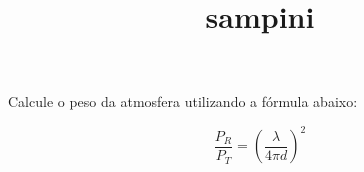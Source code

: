 \documentclass[prova]{braun}
\title{sampini}
\begin{document}
\maketitle


\begin{problem}[
	points={10}
]
Calcule o peso da atmosfera utilizando a fórmula abaixo:

{\[
\frac{P_R}{P_T} = \left ( \frac{\lambda}{4 \pi d} \right )^2
\]}

\end{problem}
\end{document}
